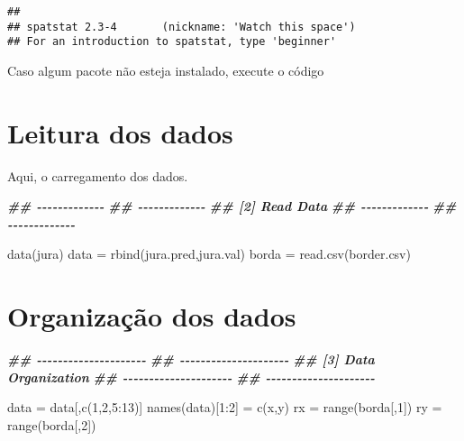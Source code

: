 \documentclass[
]{book}
\newenvironment{Shaded}{\begin{snugshade}}{\end{snugshade}}
\newcommand{\DecValTok}[1]{\textcolor[rgb]{0.00,0.00,0.81}{#1}}
\newcommand{\DocumentationTok}[1]{\textcolor[rgb]{0.56,0.35,0.01}{\textbf{\textit{#1}}}}
\newcommand{\FunctionTok}[1]{\textcolor[rgb]{0.00,0.00,0.00}{#1}}
\newcommand{\NormalTok}[1]{#1}
\newcommand{\OtherTok}[1]{\textcolor[rgb]{0.56,0.35,0.01}{#1}}
\newcommand{\SpecialCharTok}[1]{\textcolor[rgb]{0.00,0.00,0.00}{#1}}
\newcommand{\StringTok}[1]{\textcolor[rgb]{0.31,0.60,0.02}{#1}}
\theoremstyle{definition}
\theoremstyle{definition}
\theoremstyle{definition}
\theoremstyle{definition}
\theoremstyle{remark}
\begin{document}
\begin{verbatim}
## 
## spatstat 2.3-4       (nickname: 'Watch this space') 
## For an introduction to spatstat, type 'beginner'
\end{verbatim}

Caso algum pacote não esteja instalado, execute o código

\hypertarget{leitura-dos-dados}{%
\section{Leitura dos dados}\label{leitura-dos-dados}}

Aqui, o carregamento dos dados.

\begin{Shaded}
\begin{Highlighting}[]
\DocumentationTok{\#\# {-}{-}{-}{-}{-}{-}{-}{-}{-}{-}{-}{-}{-}}
\DocumentationTok{\#\# {-}{-}{-}{-}{-}{-}{-}{-}{-}{-}{-}{-}{-}}
\DocumentationTok{\#\# [2] Read Data}
\DocumentationTok{\#\# {-}{-}{-}{-}{-}{-}{-}{-}{-}{-}{-}{-}{-}}
\DocumentationTok{\#\# {-}{-}{-}{-}{-}{-}{-}{-}{-}{-}{-}{-}{-}}

\FunctionTok{data}\NormalTok{(jura)}
\NormalTok{data }\OtherTok{=} \FunctionTok{rbind}\NormalTok{(jura.pred,jura.val)}
\NormalTok{borda }\OtherTok{=} \FunctionTok{read.csv}\NormalTok{(}\StringTok{\textquotesingle{}border.csv\textquotesingle{}}\NormalTok{)}
\end{Highlighting}
\end{Shaded}

\hypertarget{organizauxe7uxe3o-dos-dados}{%
\section{Organização dos dados}\label{organizauxe7uxe3o-dos-dados}}

\begin{Shaded}
\begin{Highlighting}[]
\DocumentationTok{\#\# {-}{-}{-}{-}{-}{-}{-}{-}{-}{-}{-}{-}{-}{-}{-}{-}{-}{-}{-}{-}{-}}
\DocumentationTok{\#\# {-}{-}{-}{-}{-}{-}{-}{-}{-}{-}{-}{-}{-}{-}{-}{-}{-}{-}{-}{-}{-}}
\DocumentationTok{\#\# [3] Data Organization}
\DocumentationTok{\#\# {-}{-}{-}{-}{-}{-}{-}{-}{-}{-}{-}{-}{-}{-}{-}{-}{-}{-}{-}{-}{-}}
\DocumentationTok{\#\# {-}{-}{-}{-}{-}{-}{-}{-}{-}{-}{-}{-}{-}{-}{-}{-}{-}{-}{-}{-}{-}}

\NormalTok{data }\OtherTok{=}\NormalTok{ data[,}\FunctionTok{c}\NormalTok{(}\DecValTok{1}\NormalTok{,}\DecValTok{2}\NormalTok{,}\DecValTok{5}\SpecialCharTok{:}\DecValTok{13}\NormalTok{)]}
\FunctionTok{names}\NormalTok{(data)[}\DecValTok{1}\SpecialCharTok{:}\DecValTok{2}\NormalTok{] }\OtherTok{=} \FunctionTok{c}\NormalTok{(}\StringTok{\textquotesingle{}x\textquotesingle{}}\NormalTok{,}\StringTok{\textquotesingle{}y\textquotesingle{}}\NormalTok{)}
\NormalTok{rx }\OtherTok{=} \FunctionTok{range}\NormalTok{(borda[,}\DecValTok{1}\NormalTok{])}
\NormalTok{ry }\OtherTok{=} \FunctionTok{range}\NormalTok{(borda[,}\DecValTok{2}\NormalTok{])}
\end{Highlighting}
\end{Shaded}
\end{document}
